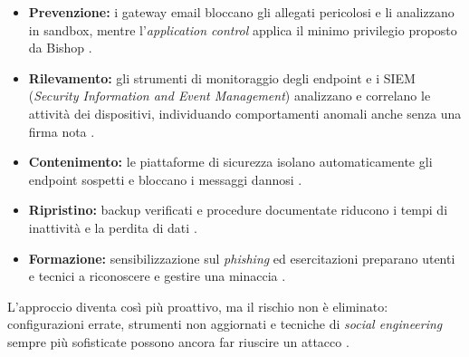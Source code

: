\begin{itemize}
    \item \textbf{Prevenzione:} i gateway email bloccano gli allegati pericolosi e li analizzano in sandbox, mentre l'\emph{application control} applica il minimo privilegio proposto da Bishop \cite{bishop2000, nelson2025, nist2024csf}.
    \item \textbf{Rilevamento:} gli strumenti di monitoraggio degli endpoint e i SIEM (\emph{Security Information and Event Management}) analizzano e correlano le attività dei dispositivi, individuando comportamenti anomali anche senza una firma nota \cite{nelson2025, nist2024csf}.
    \item \textbf{Contenimento:} le piattaforme di sicurezza isolano automaticamente gli endpoint sospetti e bloccano i messaggi dannosi \cite{nelson2025, nist2024csf}.
    \item \textbf{Ripristino:} backup verificati e procedure documentate riducono i tempi di inattività e la perdita di dati \cite{nelson2025, nist2024csf}.
    \item \textbf{Formazione:} sensibilizzazione sul \emph{phishing} ed esercitazioni preparano utenti e tecnici a riconoscere e gestire una minaccia \cite{nelson2025, nist2024csf}.
\end{itemize}

L'approccio diventa così più proattivo, ma il rischio non è eliminato: configurazioni errate, strumenti non aggiornati e tecniche di \emph{social engineering} sempre più sofisticate possono ancora far riuscire un attacco \cite{nelson2025, nist2024csf}.
